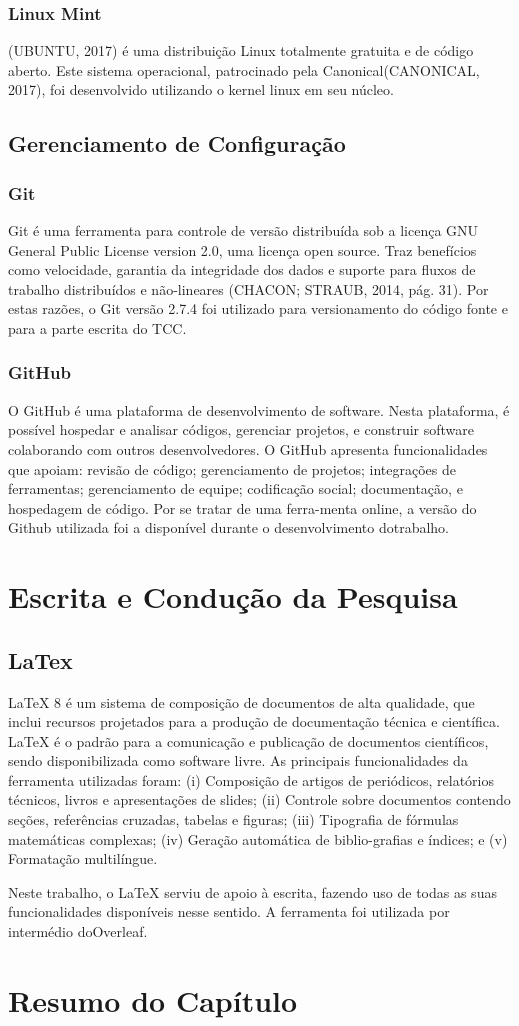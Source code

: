 \subsubsection{Linux Mint}
(UBUNTU, 2017) é uma distribuição Linux totalmente gratuita e de código aberto. Este sistema operacional, patrocinado pela Canonical(CANONICAL, 2017), foi desenvolvido utilizando o kernel linux em seu núcleo.

\subsection{Gerenciamento de Configuração}

\subsubsection{Git}
Git é uma ferramenta para controle de versão distribuída sob a licença GNU General Public License version 2.0, uma licença open source. Traz benefícios como velocidade, garantia da integridade dos dados e suporte para fluxos de trabalho distribuídos e não-lineares (CHACON; STRAUB, 2014, pág. 31). Por estas razões, o Git versão 2.7.4 foi utilizado para versionamento do código fonte e para a parte escrita do TCC.

\subsubsection{GitHub}

O GitHub é uma plataforma de desenvolvimento de software. Nesta plataforma, é possível hospedar e analisar códigos, gerenciar projetos, e construir software colaborando com outros desenvolvedores. O GitHub apresenta funcionalidades que apoiam: revisão de código; gerenciamento de projetos; integrações de ferramentas; gerenciamento de equipe; codificação social; documentação, e hospedagem de código. Por se tratar de uma ferra-menta online, a versão do Github utilizada foi a disponível durante o desenvolvimento dotrabalho.

\section{Escrita e Condução da Pesquisa}

\subsection{LaTex}
LaTeX 8 é um sistema de composição de documentos de alta qualidade, que inclui recursos projetados para a produção de documentação técnica e científica. LaTeX é o padrão para a comunicação e publicação de documentos científicos, sendo disponibilizada como software livre. As principais funcionalidades da ferramenta utilizadas foram:
(i) Composição de artigos de periódicos, relatórios técnicos, livros e apresentações de slides;
(ii) Controle sobre documentos contendo seções, referências cruzadas, tabelas e figuras;
(iii) Tipografia de fórmulas matemáticas complexas; (iv) Geração automática de biblio-grafias e índices; e (v) Formatação multilíngue.

Neste trabalho, o LaTeX serviu de apoio à escrita, fazendo uso de todas as suas funcionalidades disponíveis nesse sentido. A ferramenta foi utilizada por intermédio doOverleaf.
\section{Resumo do Capítulo}


